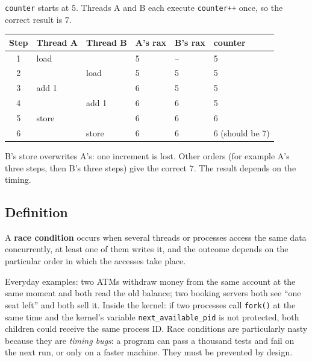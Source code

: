 \documentclass[11pt,a4paper]{article}
\newcommand{\cmd}[1]{\texttt{#1}}
\begin{document}
\begin{example}
\texttt{counter} starts at $5$. Threads A and B each execute \texttt{counter++} once, so the correct result is $7$.
\begin{center}
\renewcommand{\arraystretch}{1.15}
\begin{tabular}{@{}clllll@{}}
\toprule
\textbf{Step} & \textbf{Thread A} & \textbf{Thread B} & \textbf{A's rax} & \textbf{B's rax} & \textbf{counter}\\
\midrule
1 & load & & 5 & -- & 5\\
2 & & load & 5 & 5 & 5\\
3 & add 1 & & 6 & 5 & 5\\
4 & & add 1 & 6 & 6 & 5\\
5 & store & & 6 & 6 & 6\\
6 & & store & 6 & 6 & 6 (should be 7)\\
\bottomrule
\end{tabular}
\end{center}
B's store overwrites A's: one increment is lost. Other orders (for example A's three steps, then B's three steps) give the correct $7$. The result depends on the timing.
\end{example}

\subsection{Definition}

\begin{keyidea}
A \textbf{race condition} occurs when several threads or processes access the same data concurrently, at least one of them writes it, and the outcome depends on the particular order in which the accesses take place.
\end{keyidea}

Everyday examples: two ATMs withdraw money from the same account at the same moment and both read the old balance; two booking servers both see ``one seat left'' and both sell it. Inside the kernel: if two processes call \cmd{fork()} at the same time and the kernel's variable \texttt{next\_available\_pid} is not protected, both children could receive the same process ID. Race conditions are particularly nasty because they are \emph{timing bugs}: a program can pass a thousand tests and fail on the next run, or only on a faster machine. They must be prevented by design.

\end{document}
